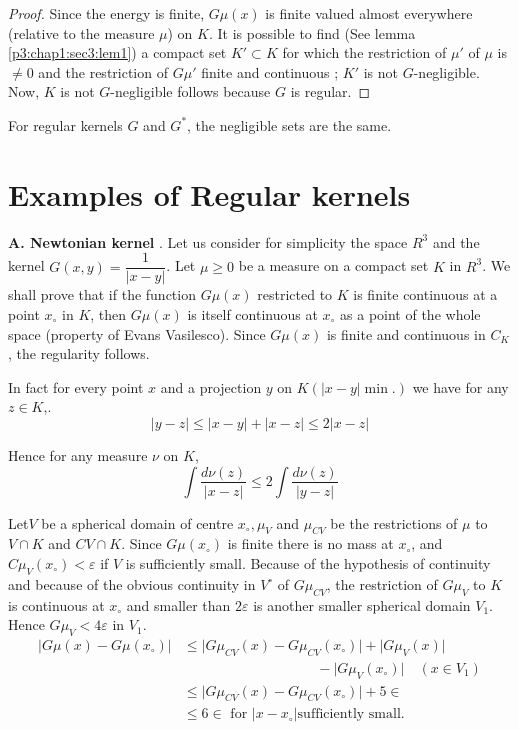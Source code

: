 \begin{proof}
  Since the energy is finite, $G \mu (x)$ is finite valued almost
  everywhere (relative to the measure $\mu$) on $K$. It is possible to
  find (See lemma \ref{p3:chap1:sec3:lem1}) a compact set $K'\subset
  K$ for which the 
  restriction of $\mu'$ of $\mu$ is $\neq 0 $ and the restriction of
  $G\mu'$ finite and continuous ; $K'$ is not $G$-negligible. Now, $K$
  is not $G$-negligible follows because $G$ is regular.  
\end{proof}

\begin{coro*}
  For regular kernels $G$ and $G^*$, the negligible sets are the same. 
\end{coro*}

\section{Examples of Regular kernels}\label{p3:chap2:sec6} %

\textbf{A. Newtonian kernel }. Let us consider for simplicity the space
$R^3$ and the kernel $G(x, y) = \dfrac{1}{|x - y|}$. Let $\mu \geq 0$
be a measure on a compact set $K$ in $R^3$. We shall prove that if the
function $G \mu (x) $ restricted to $K$ is finite continuous at a point
$x_\circ$ in $K$,  then $G \mu (x) $ is itself continuous at
$x_\circ$ as a point of the whole space (property of Evans
Vasilesco). Since $G \mu(x)$ is finite and continuous in $C_K$, the
regularity follows.  

In fact for every point $x$ and a projection $y$ on $K(| x - y |
\min.)$  we have for any $z \in K$,.  
$$
\big| y - z \big| \leq \big| x - y \big| +  \big| x - z \big| \leq 2
\big| x - z \big| 
$$

Hence for any measure $\nu$ on $K$,
$$
\int \frac{d \nu (z)}{| x - z |} \leq  2 \int \frac{d \nu (z)}{\big| y
  - z \big|} 
$$

Let\pageoriginale $V$ be a spherical domain of centre $x_\circ, \mu_V$ and $\mu
_{CV}$ be the restrictions of $\mu$ to $V \cap K$ and $CV \cap
K$. Since $G \mu (x_\circ)$ is finite there is no mass at $x_\circ$,
and $ C \mu_V (x_\circ) < \varepsilon$ if $V$ is sufficiently
small. Because of the hypothesis of continuity and because of the
obvious continuity in $V^\circ$ of $G \mu _{CV}$, the restriction of
$G\mu_V$ to $K$ is continuous at $x_\circ$ and smaller than $2
\varepsilon$ is another smaller spherical domain $V_1$. Hence $G \mu
_V < 4 \varepsilon$ in $V_1$.   
\begin{align*}
  \big| G \mu (x) - G \mu (x_\circ) \big|  & \leq \big|G \mu _{CV}(x)
  - G \mu_{CV} (x_\circ) \big| + \big| G \mu _{V}(x)\big|\\ 
  & \hspace{4cm}- \big| G \mu_{V} (x_\circ ) \big| \quad (x
  \in V_1)\\  
  & \leq \big| G\mu_{ CV} (x)  - G\mu_{ CV} (x_\circ ) \big| + 5
  \in\\ 
  &\leq  6 \in \text{ for } \big| x - x_\circ \big| \text{
    sufficiently small}. 
\end{align*}

